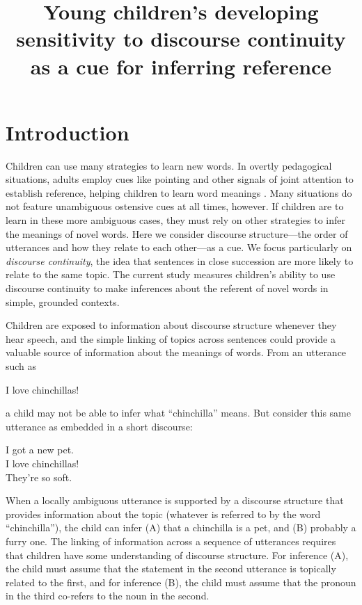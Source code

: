 \documentclass[man]{apa2}
\title{Young children's developing sensitivity to discourse continuity as a cue for inferring reference}
\begin{document}
\maketitle                            


\section{Introduction}

Children can use many strategies to learn new words.  In overtly pedagogical situations, adults employ cues like pointing and other signals of joint attention to establish reference, helping children to learn word meanings \cite{bakeman1984,csibra2010,hollich2000}.  Many situations do not feature unambiguous ostensive cues at all times, however. If children are to learn in these more ambiguous cases, they must rely on other strategies to infer the meanings of novel words. Here we consider discourse structure---the order of utterances and how they relate to each other---as a cue. We focus particularly on \emph{discourse continuity}, the idea that sentences in close succession are more likely to relate to the same topic. The current study measures children's ability to use discourse continuity to make inferences about the referent of novel words in simple, grounded contexts.

Children are exposed to information about discourse structure whenever they hear speech, and the simple linking of topics across sentences could provide a valuable source of information about the meanings of words. From an utterance such as

\begin{example}
I love chinchillas!
\end{example}

\noindent a child may not be able to infer what ``chinchilla'' means. But consider this same utterance as embedded in a short discourse:

\begin{example}
\label{ex:chin}
I got a new pet. \\ I love chinchillas! \\ They're so soft.
\end{example}

\noindent When a locally ambiguous utterance is supported by a discourse structure that provides information about the topic (whatever is referred to by the word ``chinchilla''), the child can infer (A) that a chinchilla is a pet, and (B) probably a furry one.  The linking of information across a sequence of utterances requires that children have some understanding of discourse structure.  For inference (A), the child must assume that the statement in the second utterance is topically related to the first, and for inference (B), the child must assume that the pronoun in the third co-refers to the noun in the second. 
\end{document}
